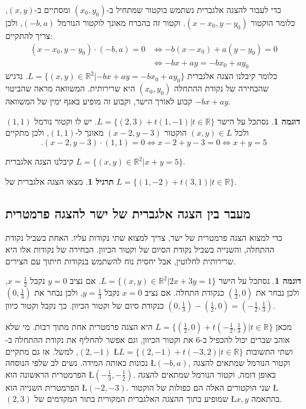 \documentclass[12pt]{book}
\theoremstyle{plain}
\theoremstyle{definition}
\newtheorem{example}[theorem]{דוגמה}
\newtheorem{exercise}[theorem]{תרגיל}
\newcommand{\R}{\mathbb{R}}
\begin{document}
כדי לעבור להצגה אלגברית נשתמש בוקטור שמתחיל ב-\((x_{0},y_{0})\)
ומסתיים ב-\((x,y)\), כלומר הוקטור \((x-x_{0},y-y_{0})\). וקטור
זה בהכרח מאונך לוקטור הנורמל \((-b,a)\), ולכן צריך להתקיים:
\begin{align*}
	(x-x_{0},y-y_{0})\cdot(-b,a)=0&\iff-b(x-x_{0})+a(y-y_{0})=0\\
    &\iff-bx+ay=-bx_{0}+ay_{0}
\end{align*}
כלומר קיבלנו הצגה אלגברית \(L=\{(x,y)\in\mathbb{R}^{2}|-bx+ay=-bx_{0}+ay_{0}\}\).
נדגיש שהבחירה של נקודת ההתחלה \((x_{0},y_{0})\) היא שרירותית.
המשוואה מראה שהביטוי \(-bx+ay\) קבוע לאורך הישר, וקבוע זה מופיע
באגף ימין של המשוואה.

\begin{example}
נסתכל על הישר \(L=\{(2,3)+t(1,-1)|t\in\mathbb{R}\}\). יש
לו וקטור נורמל \((1,1)\) ולכל \((x,y)\in L\) הוקטור \((x-2,y-3)\)
מאונך ל-\((1,1)\), ולכן מתקיים
\begin{equation*}
	.(x-2,y-3)\cdot(1,1)=0\iff x-2+y-3=0\iff x+y=5
\end{equation*}

קיבלנו הצגה אלגברית \(L=\{(x,y)\in\R^2|x+y=5\}\).
\end{example}

\begin{exercise}
מצאו הצגה אלגברית של \(L=\{(1,-2)+t(3,1)|t\in\R\}\).
\end{exercise}

\subsection{מעבר בין הצגה אלגברית של ישר להצגה פרמטרית}

כדי למצוא הצגה פרמטרית של ישר, צריך למצוא שתי נקודות עליו. האחת בשביל
נקודת ההתחלה, והשנייה בשביל נקודת הסיום של וקטור הכיוון. הבחירה של
נקודות אלו היא שרירותית לחלוטין, אבל יחסית נוח להשתמש בנקודות חיתוך
עם הצירים.

\begin{example}
נסתכל על הישר \(L=\{(x,y)\in\mathbb{R}^{2}|2x+3y=1\}\).
אם נציב \(y=0\) נקבל \(x=\frac{1}{2}\), ולכן נבחר את \((\frac{1}{2},0)\)
כנקודת התחלה. אם נציב \(x=0\) נקבל \(y=\frac{1}{3}\), ולכן נבחר
את \((0,\frac{1}{3})\) כנקודת סיום של וקטור הכיוון. כך נקבל וקטור
כיוון \((0,\frac{1}{3})-(\frac{1}{2},0)=(-\frac{1}{2},\frac{1}{3})\).

מכאן \(L=\{(\frac{1}{2},0)+t(-\frac{1}{2},\frac{1}{3})|t\in\mathbb{R}\}\)
היא הצגה פרמטרית אחת מתוך רבות. מי שלא אוהב שברים יכול להכפיל ב-\(6\)
את וקטור הכיוון, וגם אפשר להחליף את נקודת ההתחלה ב-\((2,-1)\),
למשל. אז גם מתקיים \L{$L=\{(2,-1)+t(-3,2)|t\in\mathbb{R}\}$} ושתי
התשובות נכונות באותה המידה. נשים לב שלפי הנוסחה \L{$(-b,a)$}, וקטור
הנורמל שמתאים להצגה הפרמטרית הראשונה הוא \L{$(-\frac{1}{3},-\frac{1}{2})$}.
באופן דומה, וקטור הנורמל שמתאים להצגה הפרמטרית השנייה הוא \L{$(-2,-3)$}.
שני הוקטורים האלה הם כפולות של הוקטור \L{$(2,3)$} שמופיע בתוך ההצגה
האלגברית המקורית בתור המקדמים של \L{$x,y$} בהתאמה.
\end{example}
\end{document}
